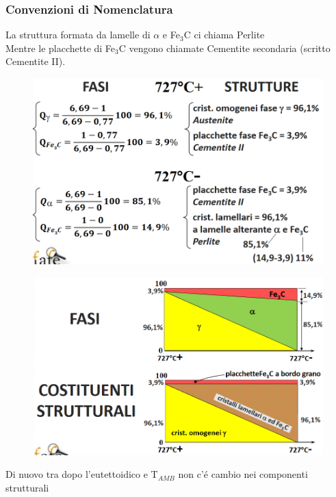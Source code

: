 \documentclass{article}
\begin{document}
{            \subsubsection{Convenzioni di Nomenclatura}
                La struttura formata da lamelle di $\alpha$ e Fe$_3$C ci chiama Perlite\\
                Mentre le placchette di Fe$_3$C vengono chiamate Cementite secondaria (scritto Cementite II).
            \begin{figure}[h!]
                \centering
                \includegraphics[width=.8\linewidth]{L13 - Fe-C 1C Calcolo fasi e costituenti.png}
            \end{figure}
            \begin{figure}[h!]
                \centering
                \includegraphics[width=.8\linewidth]{L13 - Fe-C 1=C Diagrammi fasi e costituenti.png}
            \end{figure}
            Di nuovo tra dopo l'eutettoidico e T$_{AMB}$ non c'\'e cambio nei componenti strutturali
        \newpage
}
\end{document}
